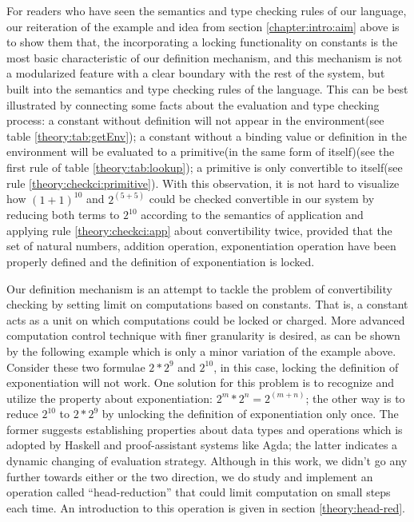 For readers who have seen the semantics and type checking rules of our language, our reiteration of the example and idea from section \ref{chapter:intro:aim} above is to show them that, the incorporating a locking functionality on constants is the most basic characteristic of our definition mechanism, and this mechanism is not a modularized feature with a clear boundary with the rest of the system, but built into the semantics and type checking rules of the language. This can be best illustrated by connecting some facts about the evaluation and type checking process: a constant without definition will not appear in the environment(see table \ref{theory:tab:getEnv}); a constant without a binding value or definition in the environment will be evaluated to a primitive(in the same form of itself)(see the first rule of table \ref{theory:tab:lookup}); a primitive is only convertible to itself(see rule \ref{theory:checkci:primitive}). With this observation, it is not hard to visualize how $(1+1)^{10}$ and $2^{(5+5)}$ could be checked convertible in our system by reducing both terms to $2^{10}$ according to the semantics of application and applying rule \ref{theory:checkci:app} about convertibility twice, provided that the set of natural numbers, addition operation, exponentiation operation have been properly defined and the definition of exponentiation is locked.

Our definition mechanism is an attempt to tackle the problem of convertibility checking by setting limit on computations based on constants. That is, a constant acts as a unit on which computations could be locked or charged. More advanced computation control technique with finer granularity is desired, as can be shown by the following example which is only a minor variation of the example above. Consider these two formulae $2 * 2^9$ and $2^{10}$, in this case, locking the definition of exponentiation will not work. One solution for this problem is to recognize and utilize the property about exponentiation: $2^m * 2^n = 2^{(m+n)}$; the other way is to reduce $2^{10}$ to $2 * 2^9$ by unlocking the definition of exponentiation only once. The former suggests establishing properties about data types and operations which is adopted by Haskell and proof-assistant systems like Agda; the latter indicates a dynamic changing of evaluation strategy. Although in this work, we didn't go any further towards either or the two direction, we do study and implement an operation called ``head-reduction'' that could limit computation on small steps each time. An introduction to this operation is given in section \ref{theory:head-red}.

